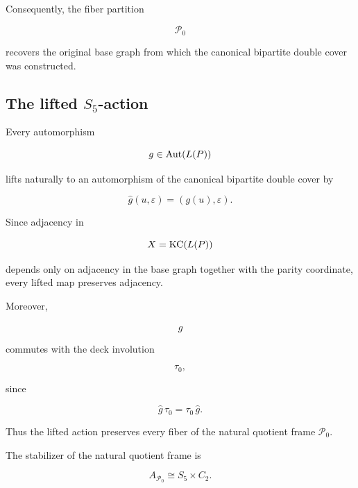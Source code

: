 Consequently, the fiber partition

\[
\mathcal P_0
\]

recovers the original base graph from which the canonical bipartite double
cover was constructed.


\subsection{The lifted \(S_{5}\)-action}

Every automorphism

\[
g\in\operatorname{Aut}(L(P))
\]

lifts naturally to an automorphism of the canonical bipartite double cover by

\[
\widehat g(u,\varepsilon)
=
(g(u),\varepsilon).
\]

Since adjacency in

\[
X=\operatorname{KC}(L(P))
\]

depends only on adjacency in the base graph together with the parity
coordinate, every lifted map preserves adjacency.

Moreover,

\[
\widehat g
\]

commutes with the deck involution

\[
\tau_0,
\]

since

\[
\widehat g\,\tau_0
=
\tau_0\,\widehat g.
\]

Thus the lifted action preserves every fiber of the natural quotient frame
\(\mathcal P_0\).

\begin{theorem}

The stabilizer of the natural quotient frame is

\[
A_{\mathcal P_0}
\cong
S_{5}\times C_{2}.
\]

\end{theorem}

